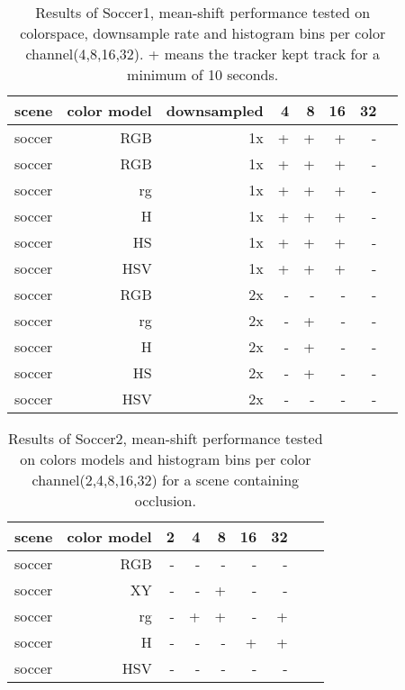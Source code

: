 \documentclass[a4paper,11pt]{article}
\begin{document}
\begin{table}
	\centering
	\caption{Results of Soccer1, mean-shift performance tested on colorspace, downsample rate and
	histogram bins per color channel(4,8,16,32). + means the tracker kept track for a minimum of 10 seconds.}

	\begin{tabular}{l*{7}{r|}}
		\label{table:fase1}
		scene	& 	color model	& downsampled 		   	& 4 & 8 & 16 & 32\\
		\hline
		soccer 	& 	RGB	 		& 1x		  			  & + & + & +  &  -\\
		soccer 	& 	RGB	 		& 1x		  			  & + & + & +  &  -\\
		soccer 	& 	rg	 		& 1x 		  			  & + & + & +  &  -\\
		soccer 	& 	H	 		& 1x		 			  & + & + & +  &  -\\
		soccer 	& 	HS	 		& 1x		  			  & + & + & +  &  -\\
		soccer 	& 	HSV	 		& 1x		  			  & + & + & +  &  -\\
		soccer 	& 	RGB	 		& 2x		  			  & - & - & -  &  -\\
		soccer 	& 	rg	 		& 2x 		  			  & - & + & -  &  -\\
		soccer 	& 	H	 		& 2x		  			  & - & + & -  &  -\\
		soccer 	& 	HS	 		& 2x		  			  & - & + & -  &  -\\
		soccer 	& 	HSV	 		& 2x		  			  & - & - & -  &  -\\
	\end{tabular}	
\end{table}

\begin{table}
	\centering
	\caption{Results of Soccer2, mean-shift performance tested on colors models and histogram bins per color channel(2,4,8,16,32) for a scene containing occlusion.} 
	\begin{tabular}{l*{8}{r|}}
		\label{table:fase2}
		scene	& 	color model	&  2 & 4 & 8 & 16 & 32\\
		\hline
		soccer 	& 	RGB	 		&  - & - & - & - & -\\
		soccer 	& 	XY	 		&  - & - & + & - & -\\
		soccer 	& 	rg	 		&  - & + & + & - & +\\
		soccer 	& 	H	 		&  - & - & - & + & +\\
		soccer 	& 	HSV	 		&  - & - & - & - & -\\ 
	\end{tabular}	
\end{table}	
\end{document}
